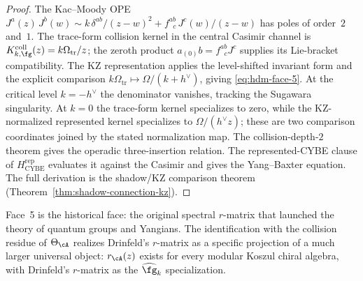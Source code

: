 \begin{proof}
The Kac--Moody OPE
$J^a(z)\, J^b(w) \sim k\,\delta^{ab}/(z-w)^2 + f^{ab}_{\;\;c}\,
J^c(w)/(z-w)$ has poles of order~$2$ and~$1$. The trace-form
collision kernel in the central Casimir channel is
$K_{k,\fg}^{\mathrm{coll}}(z)=k\Omega_{\mathrm{tr}}/z$; the zeroth
product $a_{(0)}b=f^{ab}_{\;\;c}J^c$ supplies its Lie-bracket
compatibility. The KZ representation applies the level-shifted
invariant form and the explicit comparison
$k\Omega_{\mathrm{tr}}\mapsto\Omega/(k+h^\vee)$, giving
\eqref{eq:hdm-face-5}.
At the critical level $k = -h^\vee$ the denominator vanishes,
tracking the Sugawara singularity.
At $k=0$ the trace-form kernel specializes to zero, while the
KZ-normalized represented kernel specializes to
$\Omega/(h^\vee z)$; these are two comparison coordinates joined by
the stated normalization map. The collision-depth-$2$ theorem gives
the operadic three-insertion relation. The represented-CYBE clause of
$H_{\mathrm{CYBE}}^{\mathrm{rep}}$ evaluates it against the Casimir
and gives the Yang--Baxter equation. The full
derivation is the shadow/KZ comparison theorem
(Theorem~\ref{thm:shadow-connection-kz}).
\end{proof}

Face~5 is the historical face: the original spectral $r$-matrix that
launched the theory of quantum groups and Yangians. The
identification with the collision residue of $\Theta_\cA$ realizes
Drinfeld's $r$-matrix as a specific projection of a much larger
universal object: $r_\cA(z)$ exists for every modular Koszul chiral
algebra, with Drinfeld's $r$-matrix as the
$\widehat{\fg}_k$ specialization.


